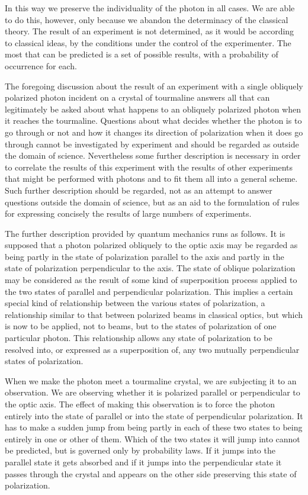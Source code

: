 In this way we preserve the individuality of the photon in all cases.  We are able to do this, however, only because we abandon the determinacy of the classical theory.  The result of an experiment is not determined, as it would be according to classical ideas, by the conditions under the control of the experimenter.  The most that can be predicted is a set of possible results, with a probability of occurrence for each.

The foregoing discussion about the result of an experiment with a single obliquely polarized photon incident on a crystal of tourmaline answers all that can legitimately be asked about what happens to an obliquely polarized photon when it reaches the tourmaline.  Questions about what decides whether the photon is to go through or not and how it changes its direction of polarization when it does go through cannot be investigated by experiment and should be regarded as outside the domain of science.  Nevertheless some further description is necessary in order to correlate the results of this experiment with the results of other experiments that might be performed with photons and to fit them all into a general scheme.  Such further description should be regarded, not as an attempt to answer questions outside the domain of science, but as an aid to the formulation of rules for expressing concisely the results of large numbers of experiments.

The further description provided by quantum mechanics runs as follows.  It is supposed that a photon polarized obliquely to the optic axis may be regarded as being partly in the state of polarization parallel to the axis and partly in the state of polarization perpendicular to the axis.  The state of oblique polarization may be considered as the result of some kind of superposition process applied to the two states of parallel and perpendicular polarization.  This implies a certain special kind of relationship between the various states of polarization, a relationship similar to that between polarized beams in classical optics, but which is now to be applied, not to beams, but to the states of polarization of one particular photon.  This relationship allows any state of polarization to be resolved into, or expressed as a superposition of, any two mutually perpendicular states of polarization.

When we make the photon meet a tourmaline crystal, we are subjecting it to an observation.  We are observing whether it is polarized parallel or perpendicular to the optic axis.  The effect of making this observation is to force the photon entirely into the state of parallel or into the state of perpendicular polarization.  It has to make a sudden jump from being partly in each of these two states to being entirely in one or other of them.  Which of the two states it will jump into cannot be predicted, but is governed only by probability laws.  If it jumps into the parallel state it gets absorbed and if it jumps into the perpendicular state it passes through the crystal and appears on the other side preserving this state of polarization.

